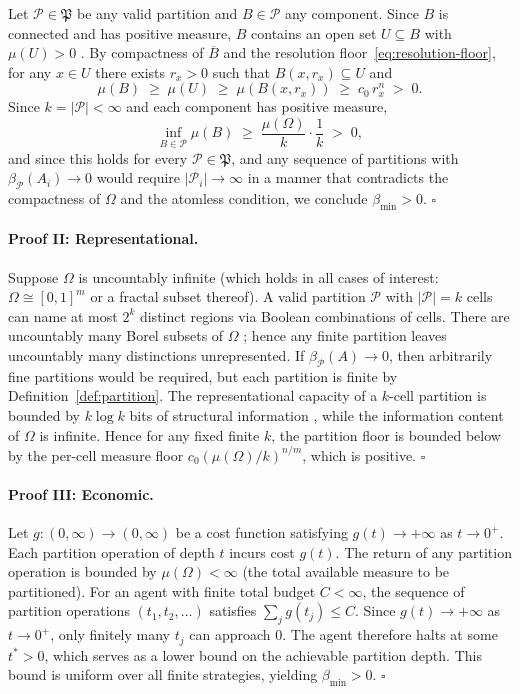 \documentclass[12pt,a4paper,twocolumn]{article}
\theoremstyle{plain}
\theoremstyle{definition}
\theoremstyle{remark}
\newcommand{\Part}{\mathcal{P}}
\newcommand{\bmin}{\beta_{\min}}
\newcommand{\bP}{\beta_{\mathcal{P}}}
\begin{document}
Let $\Part \in \mathfrak{P}$ be any valid partition and $B \in \Part$ any
component.  Since $B$ is connected and has positive measure, $B$ contains an
open set $U \subseteq B$ with $\mu(U) > 0$ \citep{rudin1987real}.  By
compactness of $\overline{B}$ and the resolution floor~\eqref{eq:resolution-floor},
for any $x \in U$ there exists $r_x > 0$ such that $B(x, r_x) \subseteq U$
and
\begin{equation}
  \mu(B) \;\geq\; \mu(U) \;\geq\; \mu\!\left(B(x,r_x)\right)
    \;\geq\; c_0\, r_x^n \;>\; 0.
\end{equation}
Since $k = |\Part| < \infty$ and each component has positive measure,
\begin{equation}
  \inf_{B \in \Part} \mu(B) \;\geq\;
    \frac{\mu(\Omega)}{k} \cdot \frac{1}{k} \;>\; 0,
\end{equation}
and since this holds for every $\Part \in \mathfrak{P}$, and any sequence of
partitions with $\bP(A_i) \to 0$ would require $|\Part_i| \to \infty$ in a
manner that contradicts the compactness of $\Omega$ and the atomless
condition, we conclude $\bmin > 0$.  $\square$

\paragraph{Proof II: Representational.}

Suppose $\Omega$ is uncountably infinite (which holds in all cases of
interest: $\Omega \cong [0,1]^m$ or a fractal subset thereof).  A valid
partition $\Part$ with $|\Part| = k$ cells can name at most $2^k$ distinct
regions via Boolean combinations of cells.  There are uncountably many Borel
subsets of $\Omega$ \citep{bogachev2007measure}; hence any finite partition
leaves uncountably many distinctions unrepresented.  If $\bP(A) \to 0$, then
arbitrarily fine partitions would be required, but each partition is finite
by Definition~\ref{def:partition}.  The representational capacity of a
$k$-cell partition is bounded by $k \log k$ bits of structural information
\citep{cover2006elements}, while the information content of $\Omega$ is
infinite.  Hence for any fixed finite $k$, the partition floor is bounded
below by the per-cell measure floor $c_0 (\mu(\Omega)/k)^{n/m}$, which is
positive.  $\square$

\paragraph{Proof III: Economic.}

Let $g : (0,\infty) \to (0,\infty)$ be a cost function satisfying $g(t) \to
+\infty$ as $t \to 0^+$.  Each partition operation of depth $t$ incurs cost
$g(t)$.  The return of any partition operation is bounded by $\mu(\Omega) <
\infty$ (the total available measure to be partitioned).  For an agent with
finite total budget $C < \infty$, the sequence of partition operations
$(t_1, t_2, \ldots)$ satisfies $\sum_j g(t_j) \leq C$.  Since $g(t) \to
+\infty$ as $t \to 0^+$, only finitely many $t_j$ can approach $0$.  The
agent therefore halts at some $t^* > 0$, which serves as a lower bound on
the achievable partition depth.  This bound is uniform over all finite
strategies, yielding $\bmin > 0$.  $\square$
\end{document}
